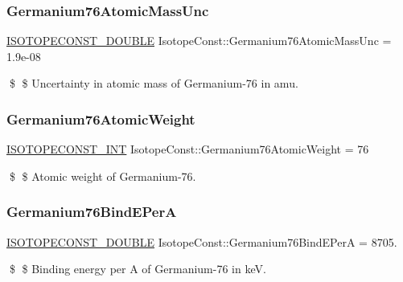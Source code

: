 \subsubsection{\texorpdfstring{Germanium76\+Atomic\+Mass\+Unc}{Germanium76AtomicMassUnc}}
{\footnotesize\ttfamily \mbox{\hyperlink{group___isotope_const-_macros_ga8f45a7272ce02c0b4c65c44636ed719a}{I\+S\+O\+T\+O\+P\+E\+C\+O\+N\+S\+T\+\_\+\+D\+O\+U\+B\+LE}} Isotope\+Const\+::\+Germanium76\+Atomic\+Mass\+Unc = 1.\+9e-\/08}

\$ \$ Uncertainty in atomic mass of Germanium-\/76 in amu. \mbox{\label{group___isotope_const-_germanium-_ge76_ga03db19f96e8a8244711a8920a37c2286}} 
\subsubsection{\texorpdfstring{Germanium76\+Atomic\+Weight}{Germanium76AtomicWeight}}
{\footnotesize\ttfamily \mbox{\hyperlink{group___isotope_const-_macros_ga5f18360b3e99483a35c32d789e62621c}{I\+S\+O\+T\+O\+P\+E\+C\+O\+N\+S\+T\+\_\+\+I\+NT}} Isotope\+Const\+::\+Germanium76\+Atomic\+Weight = 76}

\$ \$ Atomic weight of Germanium-\/76. \mbox{\label{group___isotope_const-_germanium-_ge76_ga752c1cc0e65ad16d19386880fdcb45ba}} 
\subsubsection{\texorpdfstring{Germanium76\+Bind\+E\+PerA}{Germanium76BindEPerA}}
{\footnotesize\ttfamily \mbox{\hyperlink{group___isotope_const-_macros_ga8f45a7272ce02c0b4c65c44636ed719a}{I\+S\+O\+T\+O\+P\+E\+C\+O\+N\+S\+T\+\_\+\+D\+O\+U\+B\+LE}} Isotope\+Const\+::\+Germanium76\+Bind\+E\+PerA = 8705.}

\$ \$ Binding energy per A of Germanium-\/76 in keV. \mbox{\label{group___isotope_const-_germanium-_ge76_ga8ebb41d19e44f9b6cc7dbbe096d93d19}} 
